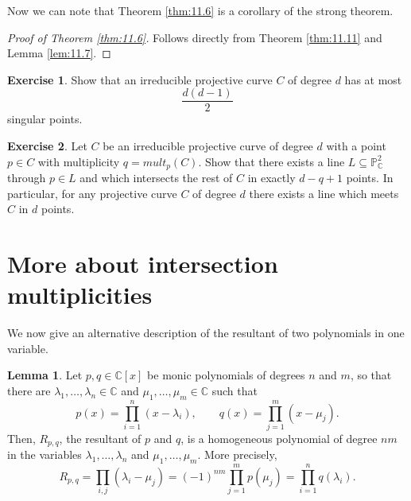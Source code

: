 \documentclass{article}
\newcommand{\C}{\mathbb{C}}
\renewcommand{\P}{\mathbb{P}}
\newcommand{\rb}[1]{\left( #1 \right)}
\renewcommand{\sb}[1]{\left[ #1 \right]}
\theoremstyle{definition}\newtheorem{definition}{Definition}[section]
\theoremstyle{definition}\newtheorem{notation}[definition]{Notation}
\theoremstyle{definition}\newtheorem{remark}[definition]{Remark}
\theoremstyle{definition}\newtheorem{example}[definition]{Example}
\theoremstyle{definition}\newtheorem{fact}{Fact}
\theoremstyle{definition}\newtheorem{exercise}{Exercise}
\newtheorem{lemma}[definition]{Lemma}
\begin{document}
Now we can note that Theorem \ref{thm:11.6} is a corollary of the strong theorem.

\begin{proof}[Proof of Theorem \ref{thm:11.6}]
Follows directly from Theorem \ref{thm:11.11} and Lemma \ref{lem:11.7}.
\end{proof}

\begin{exercise}
Show that an irreducible projective curve $ C $ of degree $ d $ has at most
$$ \dfrac{d\rb{d - 1}}{2} $$
singular points.
\end{exercise}

\begin{exercise}
Let $ C $ be an irreducible projective curve of degree $ d $ with a point $ p \in C $ with multiplicity $ q = mult_p\rb{C} $. Show that there exists a line $ L \subseteq \P_\C^2 $ through $ p \in L $ and which intersects the rest of $ C $ in exactly $ d - q + 1 $ points. In particular, for any projective curve $ C $ of degree $ d $ there exists a line which meets $ C $ in $ d $ points.
\end{exercise}

\section{More about intersection multiplicities}

We now give an alternative description of the resultant of two polynomials in one variable.

\begin{lemma}
\label{lem:12.1}
Let $ p, q \in \C\sb{x} $ be monic polynomials of degrees $ n $ and $ m $, so that there are $ \lambda_1, \dots, \lambda_n \in \C $ and $ \mu_1, \dots, \mu_m  \in \C $ such that
$$ p\rb{x} = \prod_{i = 1}^n \rb{x - \lambda_i}, \qquad q\rb{x} = \prod_{j = 1}^m \rb{x - \mu_j}. $$
Then, $ R_{p, q} $, the resultant of $ p $ and $ q $, is a homogeneous polynomial of degree $ nm $ in the variables $ \lambda_1, \dots, \lambda_n $ and $ \mu_1, \dots, \mu_m $. More precisely,
$$ R_{p, q} = \prod_{i, j}\rb{\lambda_i - \mu_j} = \rb{-1}^{nm}\prod_{j = 1}^m p\rb{\mu_j} = \prod_{i = 1}^n q\rb{\lambda_i}. $$
\end{lemma}
\end{document}
